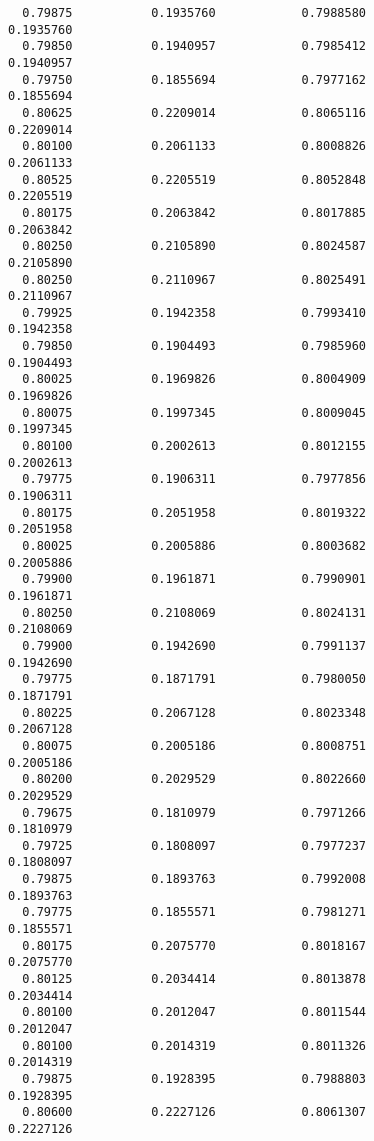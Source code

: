 \documentclass[
  letterpaper,
  DIV=11,
  numbers=noendperiod]{scrartcl}
\begin{document}
\begin{verbatim}
  0.79875           0.1935760            0.7988580            0.1935760     
  0.79850           0.1940957            0.7985412            0.1940957     
  0.79750           0.1855694            0.7977162            0.1855694     
  0.80625           0.2209014            0.8065116            0.2209014     
  0.80100           0.2061133            0.8008826            0.2061133     
  0.80525           0.2205519            0.8052848            0.2205519     
  0.80175           0.2063842            0.8017885            0.2063842     
  0.80250           0.2105890            0.8024587            0.2105890     
  0.80250           0.2110967            0.8025491            0.2110967     
  0.79925           0.1942358            0.7993410            0.1942358     
  0.79850           0.1904493            0.7985960            0.1904493     
  0.80025           0.1969826            0.8004909            0.1969826     
  0.80075           0.1997345            0.8009045            0.1997345     
  0.80100           0.2002613            0.8012155            0.2002613     
  0.79775           0.1906311            0.7977856            0.1906311     
  0.80175           0.2051958            0.8019322            0.2051958     
  0.80025           0.2005886            0.8003682            0.2005886     
  0.79900           0.1961871            0.7990901            0.1961871     
  0.80250           0.2108069            0.8024131            0.2108069     
  0.79900           0.1942690            0.7991137            0.1942690     
  0.79775           0.1871791            0.7980050            0.1871791     
  0.80225           0.2067128            0.8023348            0.2067128     
  0.80075           0.2005186            0.8008751            0.2005186     
  0.80200           0.2029529            0.8022660            0.2029529     
  0.79675           0.1810979            0.7971266            0.1810979     
  0.79725           0.1808097            0.7977237            0.1808097     
  0.79875           0.1893763            0.7992008            0.1893763     
  0.79775           0.1855571            0.7981271            0.1855571     
  0.80175           0.2075770            0.8018167            0.2075770     
  0.80125           0.2034414            0.8013878            0.2034414     
  0.80100           0.2012047            0.8011544            0.2012047     
  0.80100           0.2014319            0.8011326            0.2014319     
  0.79875           0.1928395            0.7988803            0.1928395     
  0.80600           0.2227126            0.8061307            0.2227126     

\end{verbatim}
\end{document}
